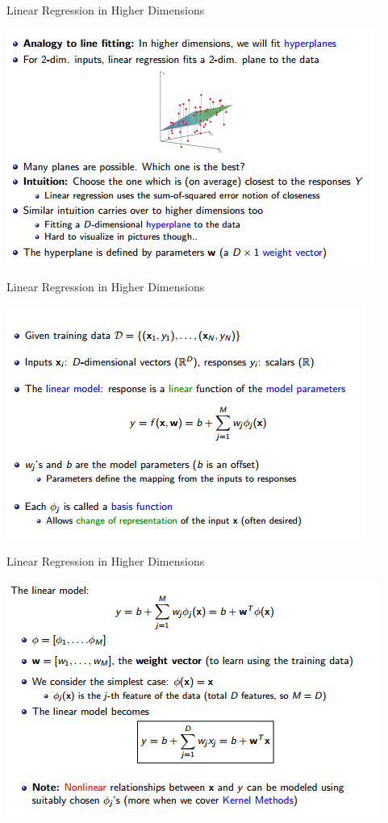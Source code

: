\documentclass{beamer}
\begin{document}
\begin{frame}{Linear Regression in Higher Dimensions}
    \begin{center}
        \includegraphics[scale=0.6]{linearRegrHigherD1.png}
    \end{center}
\end{frame}
\begin{frame}{Linear Regression in Higher Dimensions}
    \begin{center}
        \includegraphics[scale=0.6]{linearRegrHigherD2.png}
    \end{center}
\end{frame}
\begin{frame}{Linear Regression in Higher Dimensions}
    \begin{center}
        \includegraphics[scale=0.6]{linearRegrHigherD3.png}
    \end{center}
\end{frame}
\end{document}

